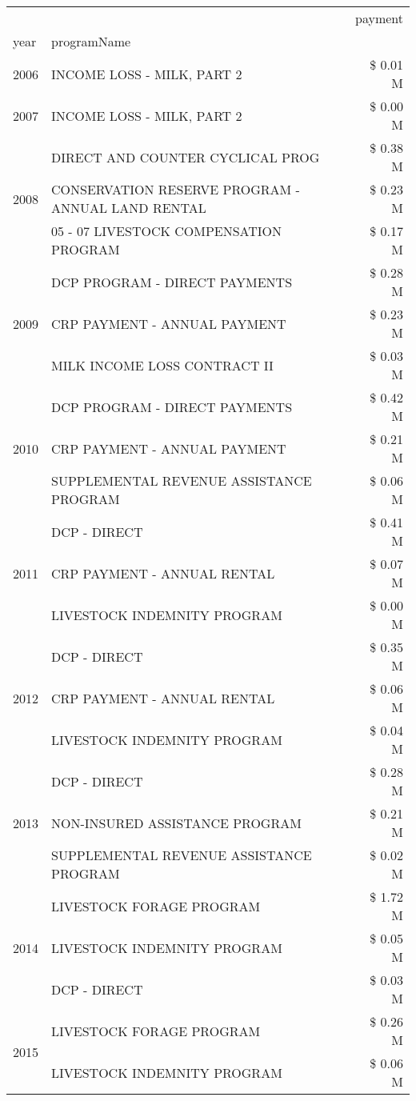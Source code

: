 \begin{tabular}{llr}
\toprule
 &  & payment \\
year & programName &  \\
\midrule
2006 & INCOME LOSS - MILK, PART 2 & \$ 0.01 M \\
\cline{1-3}
2007 & INCOME LOSS - MILK, PART 2 & \$ 0.00 M \\
\cline{1-3}
\multirow[t]{3}{*}{2008} & DIRECT AND COUNTER CYCLICAL PROG & \$ 0.38 M \\
 & CONSERVATION RESERVE PROGRAM - ANNUAL LAND RENTAL & \$ 0.23 M \\
 & 05 - 07 LIVESTOCK COMPENSATION PROGRAM & \$ 0.17 M \\
\cline{1-3}
\multirow[t]{3}{*}{2009} & DCP PROGRAM - DIRECT PAYMENTS & \$ 0.28 M \\
 & CRP PAYMENT - ANNUAL PAYMENT & \$ 0.23 M \\
 & MILK INCOME LOSS CONTRACT II & \$ 0.03 M \\
\cline{1-3}
\multirow[t]{3}{*}{2010} & DCP PROGRAM - DIRECT PAYMENTS & \$ 0.42 M \\
 & CRP PAYMENT - ANNUAL PAYMENT & \$ 0.21 M \\
 & SUPPLEMENTAL REVENUE ASSISTANCE PROGRAM & \$ 0.06 M \\
\cline{1-3}
\multirow[t]{3}{*}{2011} & DCP - DIRECT & \$ 0.41 M \\
 & CRP PAYMENT - ANNUAL RENTAL & \$ 0.07 M \\
 & LIVESTOCK INDEMNITY PROGRAM & \$ 0.00 M \\
\cline{1-3}
\multirow[t]{3}{*}{2012} & DCP - DIRECT & \$ 0.35 M \\
 & CRP PAYMENT - ANNUAL RENTAL & \$ 0.06 M \\
 & LIVESTOCK INDEMNITY PROGRAM & \$ 0.04 M \\
\cline{1-3}
\multirow[t]{3}{*}{2013} & DCP - DIRECT & \$ 0.28 M \\
 & NON-INSURED ASSISTANCE PROGRAM & \$ 0.21 M \\
 & SUPPLEMENTAL REVENUE ASSISTANCE PROGRAM & \$ 0.02 M \\
\cline{1-3}
\multirow[t]{3}{*}{2014} & LIVESTOCK FORAGE PROGRAM & \$ 1.72 M \\
 & LIVESTOCK INDEMNITY PROGRAM & \$ 0.05 M \\
 & DCP - DIRECT & \$ 0.03 M \\
\cline{1-3}
\multirow[t]{3}{*}{2015} & LIVESTOCK FORAGE PROGRAM & \$ 0.26 M \\
 & LIVESTOCK INDEMNITY PROGRAM & \$ 0.06 M \\

\end{tabular}

